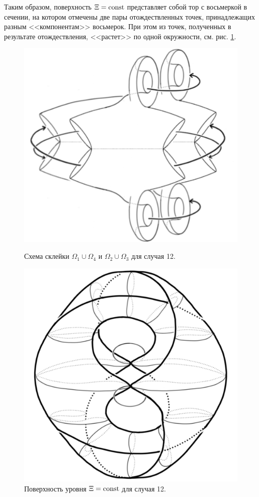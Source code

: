 Таким образом, поверхность $\Xi = \mathrm{const}$ представляет собой тор с восьмеркой в сечении, на котором отмечены  две пары отождествленных точек, принадлежащих разным <<компонентам>> восьмерок. При этом из точек, полученных в результате отождествления, <<растет>> по одной окружности, см. рис. \ref{fig:pt9:_atom_12}.


\begin{figure}[!htb]
\centering
\includegraphics[scale=0.3]{images/ch4/section2/atoms/atom_12_half.pdf}
    \caption{Схема склейки $\Omega_1 \cup \Omega_4$ и $\Omega_2 \cup \Omega_3$ для случая 12.}
    \label{fig:pt9:_atom_12_half}
\endminipage\hfill
{}
\centering
\includegraphics[scale=0.2]{images/ch4/section2/atoms/atom_12.pdf}
    \caption{Поверхность уровня $\Xi = \mathrm{const}$ для случая 12.}
    \label{fig:pt9:_atom_12}
\endminipage\hfill
\end{figure}



